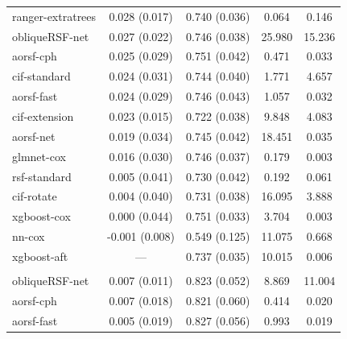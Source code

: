 \documentclass{article}\usepackage[]{graphicx}\usepackage[]{xcolor}
\newenvironment{knitrout}{}{} %
\begin{document}
\begin{knitrout}
\begin{longtable}[t]{lcccc}
\hspace{1em}ranger-extratrees & 0.028 (0.017) & 0.740 (0.036) & 0.064 & 0.146\\
\hspace{1em}obliqueRSF-net & 0.027 (0.022) & 0.746 (0.038) & 25.980 & 15.236\\
\hspace{1em}aorsf-cph & 0.025 (0.029) & 0.751 (0.042) & 0.471 & 0.033\\
\hspace{1em}cif-standard & 0.024 (0.031) & 0.744 (0.040) & 1.771 & 4.657\\
\hspace{1em}aorsf-fast & 0.024 (0.029) & 0.746 (0.043) & 1.057 & 0.032\\
\hspace{1em}cif-extension & 0.023 (0.015) & 0.722 (0.038) & 9.848 & 4.083\\
\hspace{1em}aorsf-net & 0.019 (0.034) & 0.745 (0.042) & 18.451 & 0.035\\
\hspace{1em}glmnet-cox & 0.016 (0.030) & 0.746 (0.037) & 0.179 & 0.003\\
\hspace{1em}rsf-standard & 0.005 (0.041) & 0.730 (0.042) & 0.192 & 0.061\\
\hspace{1em}cif-rotate & 0.004 (0.040) & 0.731 (0.038) & 16.095 & 3.888\\
\hspace{1em}xgboost-cox & 0.000 (0.044) & 0.751 (0.033) & 3.704 & 0.003\\
\hspace{1em}nn-cox & -0.001 (0.008) & 0.549 (0.125) & 11.075 & 0.668\\
\hspace{1em}xgboost-aft & --- & 0.737 (0.035) & 10.015 & 0.006\\
\addlinespace[0.3em]
\multicolumn{5}{l}{\textit{\textbf{ACTG 320; death, n = 1151, p = 12}}}\\
\hline
\hspace{1em}obliqueRSF-net & 0.007 (0.011) & 0.823 (0.052) & 8.869 & 11.004\\
\hspace{1em}aorsf-cph & 0.007 (0.018) & 0.821 (0.060) & 0.414 & 0.020\\
\hspace{1em}aorsf-fast & 0.005 (0.019) & 0.827 (0.056) & 0.993 & 0.019\\

\end{longtable}
\end{knitrout}
\end{document}
